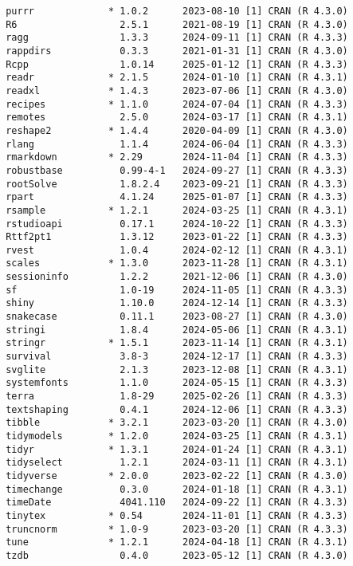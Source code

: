 \documentclass[
]{article}
\begin{document}
\begin{verbatim}
 purrr             * 1.0.2      2023-08-10 [1] CRAN (R 4.3.0)
 R6                  2.5.1      2021-08-19 [1] CRAN (R 4.3.0)
 ragg                1.3.3      2024-09-11 [1] CRAN (R 4.3.3)
 rappdirs            0.3.3      2021-01-31 [1] CRAN (R 4.3.0)
 Rcpp                1.0.14     2025-01-12 [1] CRAN (R 4.3.3)
 readr             * 2.1.5      2024-01-10 [1] CRAN (R 4.3.1)
 readxl            * 1.4.3      2023-07-06 [1] CRAN (R 4.3.0)
 recipes           * 1.1.0      2024-07-04 [1] CRAN (R 4.3.3)
 remotes             2.5.0      2024-03-17 [1] CRAN (R 4.3.1)
 reshape2          * 1.4.4      2020-04-09 [1] CRAN (R 4.3.0)
 rlang               1.1.4      2024-06-04 [1] CRAN (R 4.3.3)
 rmarkdown         * 2.29       2024-11-04 [1] CRAN (R 4.3.3)
 robustbase          0.99-4-1   2024-09-27 [1] CRAN (R 4.3.3)
 rootSolve           1.8.2.4    2023-09-21 [1] CRAN (R 4.3.3)
 rpart               4.1.24     2025-01-07 [1] CRAN (R 4.3.3)
 rsample           * 1.2.1      2024-03-25 [1] CRAN (R 4.3.1)
 rstudioapi          0.17.1     2024-10-22 [1] CRAN (R 4.3.3)
 Rttf2pt1            1.3.12     2023-01-22 [1] CRAN (R 4.3.3)
 rvest               1.0.4      2024-02-12 [1] CRAN (R 4.3.1)
 scales            * 1.3.0      2023-11-28 [1] CRAN (R 4.3.1)
 sessioninfo         1.2.2      2021-12-06 [1] CRAN (R 4.3.0)
 sf                  1.0-19     2024-11-05 [1] CRAN (R 4.3.3)
 shiny               1.10.0     2024-12-14 [1] CRAN (R 4.3.3)
 snakecase           0.11.1     2023-08-27 [1] CRAN (R 4.3.0)
 stringi             1.8.4      2024-05-06 [1] CRAN (R 4.3.1)
 stringr           * 1.5.1      2023-11-14 [1] CRAN (R 4.3.1)
 survival            3.8-3      2024-12-17 [1] CRAN (R 4.3.3)
 svglite             2.1.3      2023-12-08 [1] CRAN (R 4.3.1)
 systemfonts         1.1.0      2024-05-15 [1] CRAN (R 4.3.3)
 terra               1.8-29     2025-02-26 [1] CRAN (R 4.3.3)
 textshaping         0.4.1      2024-12-06 [1] CRAN (R 4.3.3)
 tibble            * 3.2.1      2023-03-20 [1] CRAN (R 4.3.0)
 tidymodels        * 1.2.0      2024-03-25 [1] CRAN (R 4.3.1)
 tidyr             * 1.3.1      2024-01-24 [1] CRAN (R 4.3.1)
 tidyselect          1.2.1      2024-03-11 [1] CRAN (R 4.3.1)
 tidyverse         * 2.0.0      2023-02-22 [1] CRAN (R 4.3.0)
 timechange          0.3.0      2024-01-18 [1] CRAN (R 4.3.1)
 timeDate            4041.110   2024-09-22 [1] CRAN (R 4.3.3)
 tinytex           * 0.54       2024-11-01 [1] CRAN (R 4.3.3)
 truncnorm         * 1.0-9      2023-03-20 [1] CRAN (R 4.3.3)
 tune              * 1.2.1      2024-04-18 [1] CRAN (R 4.3.1)
 tzdb                0.4.0      2023-05-12 [1] CRAN (R 4.3.0)

\end{verbatim}
\end{document}
